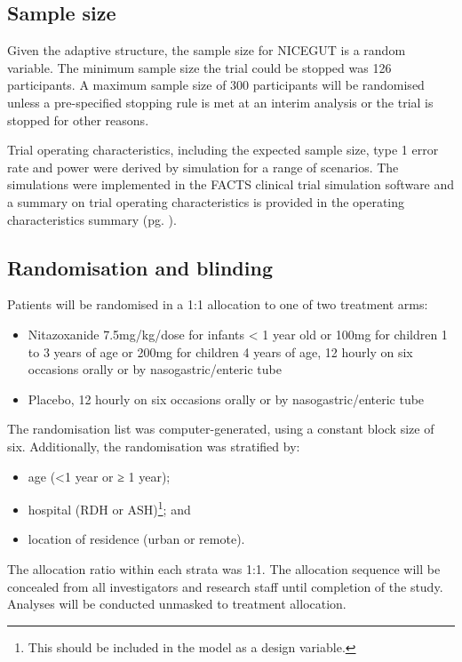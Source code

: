 \documentclass[a4paper]{article}
\begin{document}
\subsection{Sample size}

Given the adaptive structure, the sample size for NICEGUT is a random variable.
The minimum sample size the trial could be stopped was 126 participants.
A maximum sample size of 300 participants will be randomised unless a pre-specified stopping rule is met at an interim analysis or the trial is stopped for other reasons.

Trial operating characteristics, including the expected sample size, type 1 error rate and power were derived by simulation for a range of scenarios.
The simulations were implemented in the FACTS \cite{facts} clinical trial simulation software and a summary on trial operating characteristics is provided in the operating characteristics summary (pg. \pageref{summary-of-operating-characteristics}).

\subsection{Randomisation and blinding}

Patients will be randomised in a 1:1 allocation to one of two treatment arms: 

\begin{itemize}
    \item Nitazoxanide 7.5mg/kg/dose for infants < 1 year old or 100mg for children 1 to 3 years of age or 200mg for children 4 years of age, 12 hourly on six occasions orally or by nasogastric/enteric tube
    \item Placebo, 12 hourly on six occasions orally or by nasogastric/enteric tube
\end{itemize}

The randomisation list was computer-generated, using a constant block size of six.
Additionally, the randomisation was stratified by:

\begin{itemize}
    \item age (<1 year or ≥ 1 year);
    \item hospital (RDH or ASH)\footnote{This should be included in the model as a design variable.}; and
    \item location of residence (urban or remote).
\end{itemize}

The allocation ratio within each strata was 1:1.
The allocation sequence will be concealed from all investigators and research staff until completion of the study.
Analyses will be conducted unmasked to treatment allocation.
\end{document}
